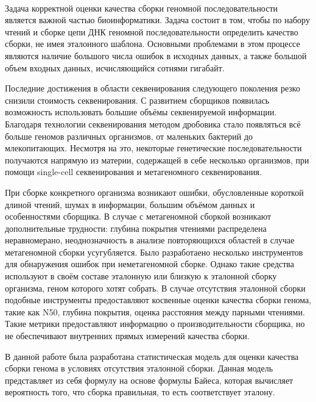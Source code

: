 \startprefacepage \\
Задача корректной оценки качества сборки геномной последовательности является важной частью биоинформатики. Задача состоит в том, чтобы по набору чтений и сборке цепи ДНК геномной последовательности определить качество сборки, не имея эталонного шаблона. Основными проблемами в этом процессе являются наличие большого числа ошибок в исходных данных, а также большой объем входных данных, исчисляющийся сотнями гигабайт. 

Последние достижения в области  секвенирования следующего поколения резко снизили стоимость секвенирования. С развитием сборщиков появилась возможность использовать большие объёмы секвенируемой информации. Благодаря технологии секвенирования методом дробовика стало появляться всё больше геномов различных организмов, от маленьких бактерий до млекопитающих. Несмотря на это, некоторые генетические последовательности получаются напрямую из материи, содержащей в себе несколько организмов, при помощи single-cell секвенирования и метагеномного секвенирования. 

При сборке конкретного организма возникают ошибки, обусловленные короткой длиной чтений, шумах в информации, большим объёмом данных и особенностями сборщика. В случае с метагеномной сборкой возникают дополнительные трудности: глубина покрытия чтениями распределена неравномерано, неоднозначность в анализе повторяющихся областей в случае метагеномной сборки усугубляется. Было разработаено несколько инструментов для обнаружения ошибок при неметагеномной сборке. Однако такие средства используют в своём составе эталонную или близкую к эталонной сборку организма, геном которого хотят собрать.
В случае отсутствия эталонной сборки подобные инструменты предоставляют косвенные оценки качества сборки генома, такие как N50, глубина покрытия, оценка расстояния между парными чтениями. Такие метрики предоставляют информацию о производительности сборщика, но не обеспечивают внутренних прямых измерений качества сборки.

В данной работе была разработана статистическая модель для оценки качества сборки генома в условиях отсутствия эталонной сборки. Данная модель представляет из себя формулу на основе формулы Байеса, которая вычисляет вероятность того, что сборка правильная, то есть соответствует эталону.